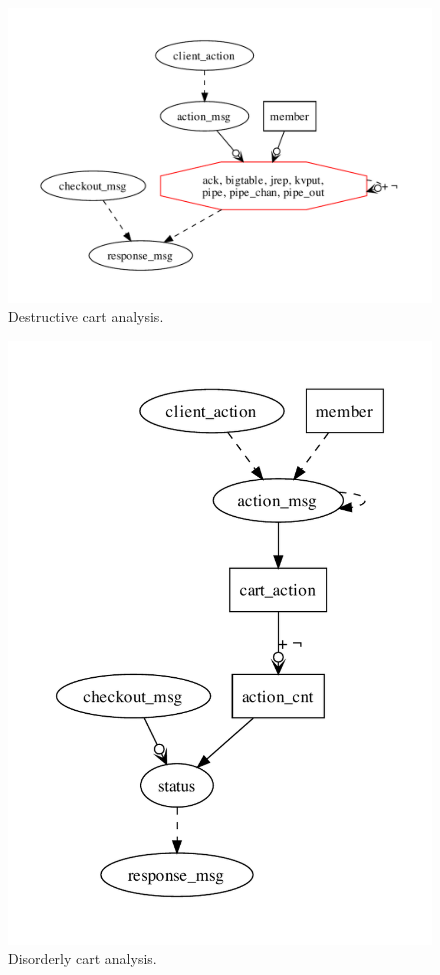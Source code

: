 \begin{figure}[t]
\centering
\includegraphics[width=0.9\linewidth]{fig/destructive.pdf}
\vspace{-10pt}
\caption{Destructive cart analysis.}
\label{fig:pdg-destructive-analysis}
\vspace{-2pt}
\end{figure}

\begin{figure}[t]
\centering
\includegraphics[width=0.7\linewidth]{fig/disorderly.pdf}
\vspace{-10pt}
\caption{Disorderly cart analysis.}
\label{fig:pdg-disorderly-analysis}
\vspace{-2pt}
\end{figure}

